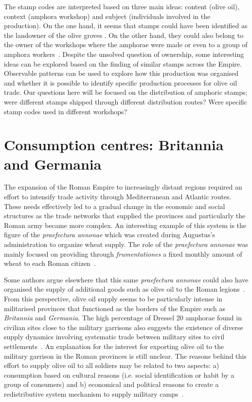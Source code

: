 The stamp codes are interpreted based on three main ideas: content (olive oil), context (amphora workshop) and subject (individuals involved in the production). On the one hand, it seems that stamps could have been identified as the landowner of the olive groves \citep{rodriguez_economioleicola_1977}. On the other hand, they could also belong to the owner of the workshops where the amphorae were made or even to a group of amphora workers~\citep{berni_millet_epigrafianforica_2008}. Despite the unsolved question of ownership, some interesting ideas can be explored based on the finding of similar stamps across the Empire. Observable patterns can be used to explore how this production was organised and whether it is possible to identify specific production processes for olive oil trade. Our questions here will be focused on the distribution of amphoric stamps; were different stamps shipped through different distribution routes? Were specific stamp codes used in different workshops?

\section{Consumption centres: Britannia and Germania}
\label{sec:3}

The expansion of the Roman Empire to increasingly distant regions required an effort to intensify trade activity through Mediterranean and Atlantic routes. These needs effectively led to a gradual change in the economic and social structures as the trade networks that supplied the provinces and particularly the Roman army became more complex. An interesting example of this system is the figure of the \textit{praefectura annonae} which was created during Augustus's administration to organize wheat supply. The role of the \textit{praefectura annonae} was mainly focused on providing through \textit{frumentationes} a fixed monthly amount of wheat to each Roman citizen~\citep{remesal_annona_1986,remesal_concierto}.

Some authors argue elsewhere that this same \textit{praefectura annonae} could also have organised the supply of additional goods such as olive oil to the Roman legions~\citep{remesal_annona_1986,remesal_annona_1990}. From this perspective, olive oil supply seems to be particularly intense in militarised provinces that functioned as the borders of the Empire such as \textit{Britannia} and \textit{Germania}. The high percentage of Dressel 20 amphorae found in civilian sites close to the military garrisons also suggests the existence of diverse supply dynamics involving systematic trade between military sites to civil settlements~\citep{remesal_annona_1986, carreras_britannia_1998}. An explanation for the interest for exporting olive oil to the military garrison in the Roman provinces is still unclear. The reasons behind this effort to supply olive oil to all soldiers may be related to two aspects: a) consumption based on cultural reasons (i.e. social identification or habit  by a group of consumers) and b) economical and political reasons to create a redistributive system mechanism to supply military camps~\citep[69-70]{carreras_britannia_1998}. 

